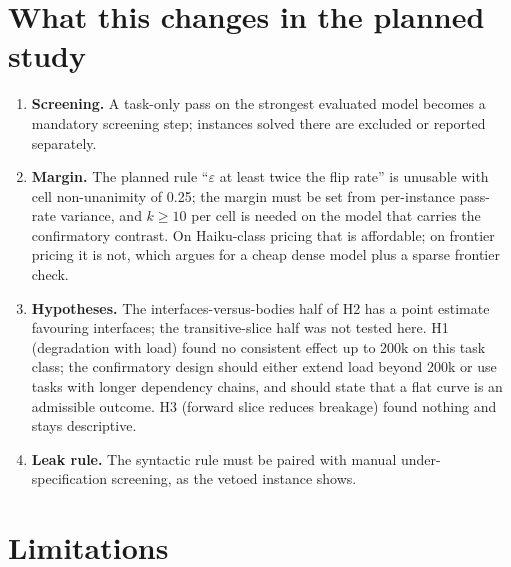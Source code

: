 \documentclass[10pt]{article}
\newcommand{\eps}{\varepsilon}
\begin{document}
\section{What this changes in the planned study}

\begin{enumerate}
\item \textbf{Screening.} A task-only pass on the strongest evaluated model becomes a mandatory screening step; instances solved there are excluded or reported separately.
\item \textbf{Margin.} The planned rule ``$\eps$ at least twice the flip rate'' is unusable with cell non-unanimity of 0.25; the margin must be set from per-instance pass-rate variance, and $k \ge 10$ per cell is needed on the model that carries the confirmatory contrast. On Haiku-class pricing that is affordable; on frontier pricing it is not, which argues for a cheap dense model plus a sparse frontier check.
\item \textbf{Hypotheses.} The interfaces-versus-bodies half of H2 has a point estimate favouring interfaces; the transitive-slice half was not tested here. H1 (degradation with load) found no consistent effect up to 200k on this task class; the confirmatory design should either extend load beyond 200k or use tasks with longer dependency chains, and should state that a flat curve is an admissible outcome. H3 (forward slice reduces breakage) found nothing and stays descriptive.
\item \textbf{Leak rule.} The syntactic rule must be paired with manual under-specification screening, as the vetoed instance shows.
\end{enumerate}

\section{Limitations}
\end{document}
